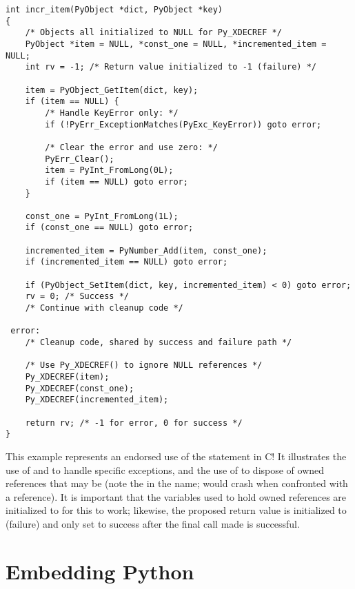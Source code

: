 \documentclass{manual}
\begin{document}
\begin{verbatim}
int incr_item(PyObject *dict, PyObject *key)
{
    /* Objects all initialized to NULL for Py_XDECREF */
    PyObject *item = NULL, *const_one = NULL, *incremented_item = NULL;
    int rv = -1; /* Return value initialized to -1 (failure) */

    item = PyObject_GetItem(dict, key);
    if (item == NULL) {
        /* Handle KeyError only: */
        if (!PyErr_ExceptionMatches(PyExc_KeyError)) goto error;

        /* Clear the error and use zero: */
        PyErr_Clear();
        item = PyInt_FromLong(0L);
        if (item == NULL) goto error;
    }

    const_one = PyInt_FromLong(1L);
    if (const_one == NULL) goto error;

    incremented_item = PyNumber_Add(item, const_one);
    if (incremented_item == NULL) goto error;

    if (PyObject_SetItem(dict, key, incremented_item) < 0) goto error;
    rv = 0; /* Success */
    /* Continue with cleanup code */

 error:
    /* Cleanup code, shared by success and failure path */

    /* Use Py_XDECREF() to ignore NULL references */
    Py_XDECREF(item);
    Py_XDECREF(const_one);
    Py_XDECREF(incremented_item);

    return rv; /* -1 for error, 0 for success */
}
\end{verbatim}

This example represents an endorsed use of the  statement 
in C!  It illustrates the use of
 and
 to
handle specific exceptions, and the use of
 to
dispose of owned references that may be \NULL{} (note the
 in the name;  would crash when
confronted with a \NULL{} reference).  It is important that the
variables used to hold owned references are initialized to \NULL{} for
this to work; likewise, the proposed return value is initialized to
 (failure) and only set to success after the final call made
is successful.


\section{Embedding Python \label{embedding}}
\end{document}

